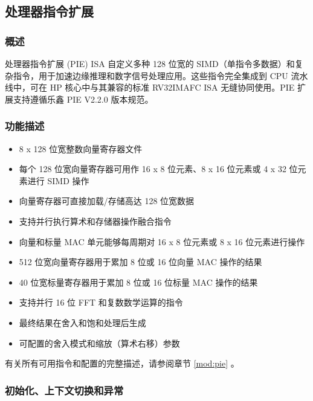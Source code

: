 \documentclass[main\_\_CN.tex]{subfiles}
\begin{document}

\newpage
\subsection{处理器指令扩展}
\label{sec:riscvcpu-pie}

\subsubsection{概述}
\label{sec:riscvcpu-pie-overview}

处理器指令扩展 (PIE) ISA 自定义多种 128 位宽的 SIMD（单指令多数据）和复杂指令，用于加速边缘推理和数字信号处理应用。这些指令完全集成到 CPU 流水线中，可在 HP 核心中与其兼容的标准 RV32IMAFC ISA 无缝协同使用。PIE 扩展支持遵循乐鑫 PIE V2.2.0 版本规范。

\subsubsection{功能描述}

\label{sec:riscvcpu-pie-func-descr}
\begin{itemize}
    \item 8 x 128 位宽整数向量寄存器文件
    \item 每个 128 位宽向量寄存器可用作 16 x 8 位元素、8 x 16 位元素或 4 x 32 位元素进行 SIMD 操作
    \item 向量寄存器可直接加载/存储高达 128 位宽数据
    \item 支持并行执行算术和存储器操作融合指令
    \item 向量和标量 MAC 单元能够每周期对 16 x 8 位元素或 8 x 16 位元素进行操作
    \item 512 位宽向量寄存器用于累加 8 位或 16 位向量 MAC 操作的结果
    \item 40 位宽标量寄存器用于累加 8 位或 16 位标量 MAC 操作的结果
    \item 支持并行 16 位 FFT 和复数数学运算的指令
    \item 最终结果在舍入和饱和处理后生成
    \item 可配置的舍入模式和缩放（算术右移）参数
\end{itemize}

有关所有可用指令和配置的完整描述，请参阅章节 \ref{mod:pie} \textit{}。

\subsubsection{初始化、上下文切换和异常}
\label{sec:riscvcpu-pie-init}
\end{document}
